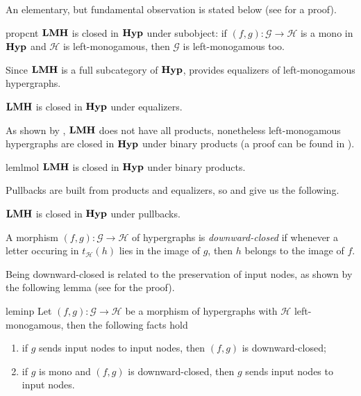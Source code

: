 \documentclass[3p]{elsarticle}
\newcommand{\catname}[1]{\textbf{\textup{#1}}}
\newcommand{\lmo}{\catname{LMH}}
\newcommand{\hyp}{\catname{Hyp}}
\theoremstyle{remark}
\theoremstyle{definition}
\begin{document}
An elementary, but fundamental observation is stated below (see  for a proof).

\begin{restatable}{prop}{cnt}\label{prop:count}
	$\lmo$ is closed in $\hyp$ under subobject: if $(f,g)\colon \mathcal{G}\to \mathcal{H}$ is a mono in $\hyp$ and $\mathcal{H}$ is left-monogamous, then $\mathcal{G}$ is left-monogamous too.
\end{restatable}

Since $\lmo$ is a full subcategory of $\hyp$, 
 provides equalizers of left-monogamous hypergraphs.
\begin{cor}\label{cor:eq}
	$\lmo$ is closed in $\hyp$ under equalizers.
\end{cor}

As shown by , $\lmo$ does not have all products, nonetheless left-monogamous hypergraphs are closed in $\hyp$ under binary products (a proof can be found in ).

\begin{restatable}{lem}{lmol}\label{lem:pro}
	$\lmo$ is closed in $\hyp$ under binary products.
\end{restatable}

Pullbacks are built from products and equalizers, so   and  give us the following.

\begin{cor}\label{cor:pb}	$\lmo$ is closed in $\hyp$ under pullbacks.
\end{cor}


\begin{defi}
A morphism $(f,g)\colon \mathcal{G}\to \mathcal{H}$ of hypergraphs  is \emph{downward-closed} if whenever a letter occuring in $t_{\mathcal{H}}(h)$ lies in the image of $g$, then $h$ belongs to the image of $f$. 
\end{defi}

Being downward-closed is related to the preservation of input nodes, as shown by the following lemma (see  for the proof).

\begin{restatable}{lem}{inp}\label{lem:inp}
	Let $(f,g)\colon \mathcal{G}\to \mathcal{H}$ be a morphism of hypergraphs with $\mathcal{H}$ left-monogamous, then the following facts hold
	\begin{enumerate}
		\item if $g$ sends input nodes to input nodes, then $(f,g)$ is downward-closed; 
		\item if $g$ is mono and $(f,g)$ is downward-closed, then $g$ sends input nodes to input nodes.
	\end{enumerate}
\end{restatable}
\end{document}

